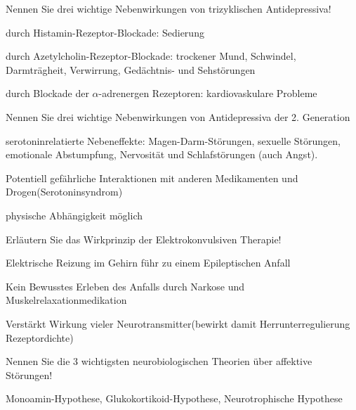 \documentclass[10pt, a4paper]{exam}
\begin{document}
\begin{questions}
  \question Nennen Sie drei wichtige Nebenwirkungen von trizyklischen Antidepressiva!
  \begin{solution}
    \begin{itemize*}
      \item durch Histamin-Rezeptor-Blockade: Sedierung
      \item durch Azetylcholin-Rezeptor-Blockade: trockener Mund, Schwindel, Darmträgheit, Verwirrung, Gedächtnis- und Sehstörungen
      \item durch Blockade der $\alpha$-adrenergen Rezeptoren: kardiovaskulare Probleme
    \end{itemize*}
  \end{solution}

  \question Nennen Sie drei wichtige Nebenwirkungen von Antidepressiva der 2. Generation
  \begin{solution}
    \begin{itemize*}
      \item serotoninrelatierte Nebeneffekte: Magen-Darm-Störungen, sexuelle Störungen, emotionale Abstumpfung, Nervosität und Schlafstörungen (auch Angst).
      \item Potentiell gefährliche Interaktionen mit anderen Medikamenten und Drogen(Serotoninsyndrom)
      \item physische Abhängigkeit möglich
    \end{itemize*}
  \end{solution}

  \question Erläutern Sie das Wirkprinzip der Elektrokonvulsiven Therapie!
  \begin{solution}
    \begin{itemize*}
      \item Elektrische Reizung im Gehirn führ zu einem Epileptischen Anfall
      \item Kein Bewusstes Erleben des Anfalls durch Narkose und Muskelrelaxationmedikation
      \item Verstärkt Wirkung vieler Neurotransmitter(bewirkt damit Herrunterregulierung Rezeptordichte)
    \end{itemize*}
  \end{solution}

  \question Nennen Sie die 3 wichtigsten neurobiologischen Theorien über affektive Störungen!
  \begin{solution}
    Monoamin-Hypothese, Glukokortikoid-Hypothese, Neurotrophische Hypothese
  \end{solution}


\end{questions}
\end{document}
